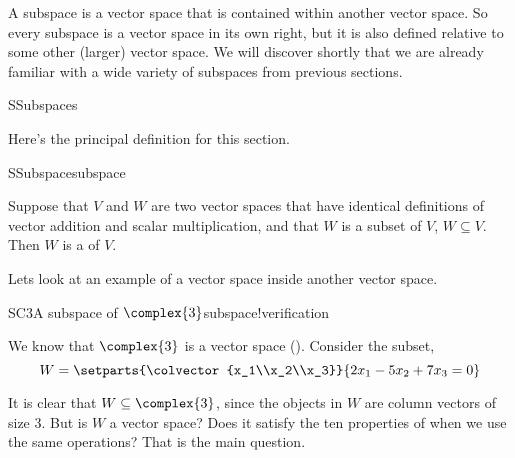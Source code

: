%
\begin{introduction}
\begin{para}A subspace is a vector space that is contained within another vector space.  So every subspace is a vector space in its own right, but it is also defined relative to some other (larger) vector space.  We will discover shortly that we are already familiar with a wide variety of subspaces from previous sections.\end{para}
\end{introduction}
%
\begin{subsect}{S}{Subspaces}
%
\begin{para}Here's the principal definition for this section.\end{para}
%
\begin{definition}{S}{Subspace}{subspace}
\begin{para}Suppose that $V$ and $W$ are two vector spaces that have identical definitions of vector addition and scalar multiplication, and that $W$ is a subset of $V$, $W\subseteq V$.  Then $W$ is a  of $V$.\end{para}
\end{definition}
%
\begin{para}Lets look at an example of a vector space inside another vector space.\end{para}
%
%
\begin{example}{SC3}{A subspace of $\complex{3}$}{subspace!verification}
\begin{para}We know that $\complex{3}$ is a vector space ().  Consider the subset,
%
\begin{equation*}
W=\setparts{\colvector{x_1\\x_2\\x_3}}{2x_1-5x_2+7x_3=0}
\end{equation*}\end{para}
%
\begin{para}It is clear that $W\subseteq\complex{3}$, since the objects in $W$ are column vectors of size 3.  But is $W$ a vector space?  Does it satisfy the ten properties of  when we use the same operations?  That is the main question.\end{para}

\end{example}
\end{subsect}

